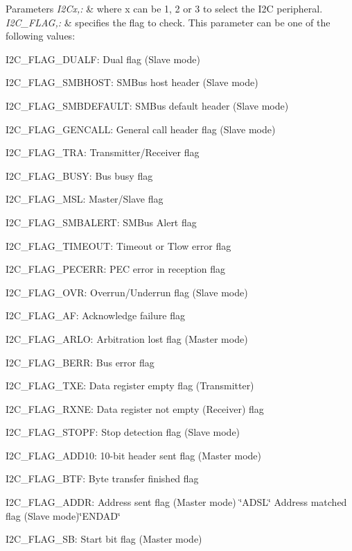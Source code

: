 \begin{DoxyParams}{Parameters}
{\em I2\-Cx,\-:} & where x can be 1, 2 or 3 to select the I2\-C peripheral. \\
\hline
{\em I2\-C\-\_\-\-F\-L\-A\-G,\-:} & specifies the flag to check. This parameter can be one of the following values\-: \begin{DoxyItemize}
\item I2\-C\-\_\-\-F\-L\-A\-G\-\_\-\-D\-U\-A\-L\-F\-: Dual flag (Slave mode) \item I2\-C\-\_\-\-F\-L\-A\-G\-\_\-\-S\-M\-B\-H\-O\-S\-T\-: S\-M\-Bus host header (Slave mode) \item I2\-C\-\_\-\-F\-L\-A\-G\-\_\-\-S\-M\-B\-D\-E\-F\-A\-U\-L\-T\-: S\-M\-Bus default header (Slave mode) \item I2\-C\-\_\-\-F\-L\-A\-G\-\_\-\-G\-E\-N\-C\-A\-L\-L\-: General call header flag (Slave mode) \item I2\-C\-\_\-\-F\-L\-A\-G\-\_\-\-T\-R\-A\-: Transmitter/\-Receiver flag \item I2\-C\-\_\-\-F\-L\-A\-G\-\_\-\-B\-U\-S\-Y\-: Bus busy flag \item I2\-C\-\_\-\-F\-L\-A\-G\-\_\-\-M\-S\-L\-: Master/\-Slave flag \item I2\-C\-\_\-\-F\-L\-A\-G\-\_\-\-S\-M\-B\-A\-L\-E\-R\-T\-: S\-M\-Bus Alert flag \item I2\-C\-\_\-\-F\-L\-A\-G\-\_\-\-T\-I\-M\-E\-O\-U\-T\-: Timeout or Tlow error flag \item I2\-C\-\_\-\-F\-L\-A\-G\-\_\-\-P\-E\-C\-E\-R\-R\-: P\-E\-C error in reception flag \item I2\-C\-\_\-\-F\-L\-A\-G\-\_\-\-O\-V\-R\-: Overrun/\-Underrun flag (Slave mode) \item I2\-C\-\_\-\-F\-L\-A\-G\-\_\-\-A\-F\-: Acknowledge failure flag \item I2\-C\-\_\-\-F\-L\-A\-G\-\_\-\-A\-R\-L\-O\-: Arbitration lost flag (Master mode) \item I2\-C\-\_\-\-F\-L\-A\-G\-\_\-\-B\-E\-R\-R\-: Bus error flag \item I2\-C\-\_\-\-F\-L\-A\-G\-\_\-\-T\-X\-E\-: Data register empty flag (Transmitter) \item I2\-C\-\_\-\-F\-L\-A\-G\-\_\-\-R\-X\-N\-E\-: Data register not empty (Receiver) flag \item I2\-C\-\_\-\-F\-L\-A\-G\-\_\-\-S\-T\-O\-P\-F\-: Stop detection flag (Slave mode) \item I2\-C\-\_\-\-F\-L\-A\-G\-\_\-\-A\-D\-D10\-: 10-\/bit header sent flag (Master mode) \item I2\-C\-\_\-\-F\-L\-A\-G\-\_\-\-B\-T\-F\-: Byte transfer finished flag \item I2\-C\-\_\-\-F\-L\-A\-G\-\_\-\-A\-D\-D\-R\-: Address sent flag (Master mode) \char`\"{}\-A\-D\-S\-L\char`\"{} Address matched flag (Slave mode)\char`\"{}\-E\-N\-D\-A\-D\char`\"{} \item I2\-C\-\_\-\-F\-L\-A\-G\-\_\-\-S\-B\-: Start bit flag (Master mode) \end{DoxyItemize}
\\
\hline
\end{DoxyParams}

